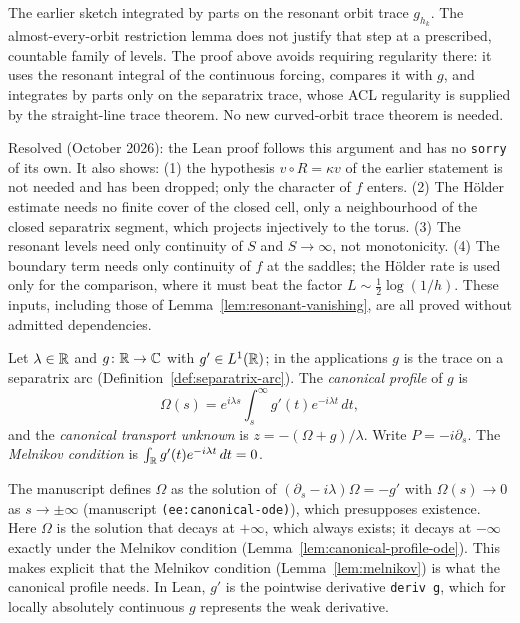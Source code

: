 \begin{remark}
The earlier sketch integrated by parts on the resonant orbit trace
$g_{h_k}$. The almost-every-orbit restriction lemma does not justify
that step at a prescribed, countable family of levels. The proof above
avoids requiring regularity there: it uses the resonant integral of the
continuous forcing, compares it with $g$, and integrates by parts only
on the separatrix trace, whose ACL regularity is supplied by the
straight-line trace theorem. No new curved-orbit trace theorem is needed.

Resolved (October 2026): the Lean proof follows this argument and has no \texttt{sorry}
of its own. It also shows: (1) the hypothesis $v\circ R=\kappa v$ of the earlier
statement is not needed and has been dropped; only the character of $f$ enters. (2) The
H\"older estimate needs no finite cover of the closed cell, only a neighbourhood of the
closed separatrix segment, which projects injectively to the torus. (3) The resonant
levels need only continuity of $S$ and $S\to\infty$, not monotonicity. (4) The boundary
term needs only continuity of $f$ at the saddles; the H\"older rate is used only for
the comparison, where it must beat the factor $L\sim\tfrac12\log(1/h)$.
These inputs, including those of Lemma~\ref{lem:resonant-vanishing}, are all
proved without admitted dependencies.
\end{remark}

\begin{definition}
\label{def:canonical-profile}
\leanok
Let $\lambda\in\mathbb{R}$ and $g\colon\mathbb{R}\to\mathbb{C}$ with $g'\in L^1(\mathbb{R})$; in the applications $g$ is
the trace on a separatrix arc (Definition~\ref{def:separatrix-arc}). The
\emph{canonical profile} of $g$ is
\[
  \Omega(s)=e^{i\lambda s}\int_s^\infty g'(t)e^{-i\lambda t}\,dt,
\]
and the \emph{canonical transport unknown} is $z=-(\Omega+g)/\lambda$. Write
$P=-i\partial_s$. The \emph{Melnikov condition} is
$\int_{\mathbb{R}} g'(t)e^{-i\lambda t}\,dt=0$.
\end{definition}

\begin{remark}
The manuscript defines $\Omega$ as the solution of
$(\partial_s-i\lambda)\Omega=-g'$ with $\Omega(s)\to0$ as $s\to\pm\infty$
(manuscript \texttt{(ee:canonical-ode)}), which presupposes existence. Here
$\Omega$ is the solution that decays at $+\infty$, which always exists; it decays at
$-\infty$ exactly under the Melnikov condition
(Lemma~\ref{lem:canonical-profile-ode}). This makes explicit that the Melnikov
condition (Lemma~\ref{lem:melnikov}) is what the canonical profile needs. In Lean,
$g'$ is the pointwise derivative \texttt{deriv g}, which for locally absolutely
continuous $g$ represents the weak derivative.
\end{remark}

